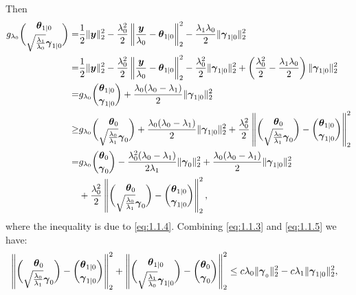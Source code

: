 Then
\begin{gather}
    \label{eq:1.1.5}
    \begin{aligned}
        g_{\lambda_0}\binom{\boldsymbol\theta_{1|0}}{\sqrt{\frac{\lambda_1}{\lambda_0}}\boldsymbol\gamma_{1|0}}=&\frac{1}{2}\lVert\boldsymbol y\rVert_2^2-\frac{\lambda_0^2}{2}\left\Vert\frac{\boldsymbol y}{\lambda_0}-\boldsymbol\theta_{1|0}\right\Vert_2^2-\frac{\lambda_1\lambda_0}{2}\lVert\boldsymbol\gamma_{1|0}\rVert_2^2\\
        =& \frac{1}{2}\lVert\boldsymbol y\rVert_2^2-\frac{\lambda_0^2}{2}\left\Vert\frac{\boldsymbol y}{\lambda_0}-\boldsymbol\theta_{1|0}\right\Vert_2^2-\frac{\lambda_0^2}{2}\lVert\boldsymbol\gamma_{1|0}\rVert_2^2+\left(\frac{\lambda_0^2}{2}-\frac{\lambda_1\lambda_0}{2}\right)\lVert\boldsymbol\gamma_{1|0}\rVert_2^2\\
        =&g_{\lambda_0}\binom{\boldsymbol\theta_{1|0}}{\boldsymbol\gamma_{1|0}}+\frac{\lambda_0(\lambda_0-\lambda_1)}{2}\lVert\boldsymbol\gamma_{1|0}\rVert_2^2\\
        \geq& g_{\lambda_0}\binom{\boldsymbol\theta_{0}}{\sqrt{\frac{\lambda_0}{\lambda_1}}\boldsymbol\gamma_{0}}+\frac{\lambda_0(\lambda_0-\lambda_1)}{2}\lVert\boldsymbol\gamma_{1|0}\rVert_2^2+\frac{\lambda_0^2}{2}\left\Vert\binom{\boldsymbol\theta_{0}}{\sqrt{\frac{\lambda_0}{\lambda_1}}\boldsymbol\gamma_{0}}-\binom{\boldsymbol\theta_{1|0}}{\boldsymbol\gamma_{1|0}}\right\Vert_2^2\\
        =&g_{\lambda_0}\binom{\boldsymbol\theta_{0}}{\boldsymbol\gamma_{0}}-\frac{\lambda_0^2(\lambda_0-\lambda_1)}{2\lambda_1}\lVert\boldsymbol\gamma_{0}\rVert_2^2+\frac{\lambda_0(\lambda_0-\lambda_1)}{2}\lVert\boldsymbol\gamma_{1|0}\rVert_2^2\\
        &+\frac{\lambda_0^2}{2}\left\Vert\binom{\boldsymbol\theta_{0}}{\sqrt{\frac{\lambda_0}{\lambda_1}}\boldsymbol\gamma_{0}}-\binom{\boldsymbol\theta_{1|0}}{\boldsymbol\gamma_{1|0}}\right\Vert_2^2,
    \end{aligned}
\end{gather}
where the inequality is due to \eqref{eq:1.1.4}. Combining \eqref{eq:1.1.3} and \eqref{eq:1.1.5} we have:
\begin{gather}
    \begin{aligned}
        &\left\Vert\binom{\boldsymbol\theta_{0}}{\sqrt{\frac{\lambda_0}{\lambda_1}}\boldsymbol\gamma_{0}}-\binom{\boldsymbol\theta_{1|0}}{\boldsymbol\gamma_{1|0}}\right\Vert_2^2+\left\Vert\binom{\boldsymbol\theta_{1|0}}{\sqrt{\frac{\lambda_1}{\lambda_0}}\boldsymbol\gamma_{1|0}}-\binom{\boldsymbol\theta_{0}}{\boldsymbol\gamma_{0}}\right\Vert_2^2\leq c\lambda_0\lVert\boldsymbol\gamma_{_0}\rVert_2^2-c\lambda_1\lVert\boldsymbol\gamma_{1|0}\rVert_2^2,
    \end{aligned}
\end{gather}
